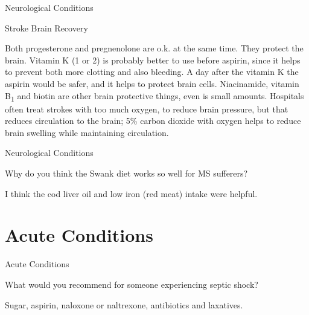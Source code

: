 \documentclass[11pt,oneside,openany,extrafontsizes]{memoir}
\begin{document}
\begin{standalonequote}{Neurological Conditions}
    \begin{note}
        Stroke Brain Recovery
    \end{note}

    \begin{answer}
        Both progesterone and pregnenolone are o.k. at the same time. They protect the brain. Vitamin K (1 or 2) is probably better to use before aspirin, since it helps to prevent both more clotting and also bleeding. A day after the vitamin K the aspirin would be safer, and it helps to protect brain cells. Niacinamide, vitamin B\textsubscript{1} and biotin are other brain protective things, even is small amounts. Hospitals often treat strokes with too much oxygen, to reduce brain pressure, but that reduces circulation to the brain; 5\% carbon dioxide with oxygen helps to reduce brain swelling while maintaining circulation.
    \end{answer}
\end{standalonequote}

\begin{qaexchange}{Neurological Conditions}

    \begin{question}
        Why do you think the Swank diet works so well for MS sufferers?
    \end{question}

    \begin{answer}
      I think the cod liver oil and low iron (red meat) intake were helpful.
    \end{answer}
\end{qaexchange}

\section{Acute Conditions}

\begin{qaexchange}{Acute Conditions}

    \begin{question}
        What would you recommend for someone experiencing septic shock? 
    \end{question}

    \begin{answer}
      Sugar, aspirin, naloxone or naltrexone, antibiotics and laxatives.
    \end{answer}
\end{qaexchange}
\end{document}
